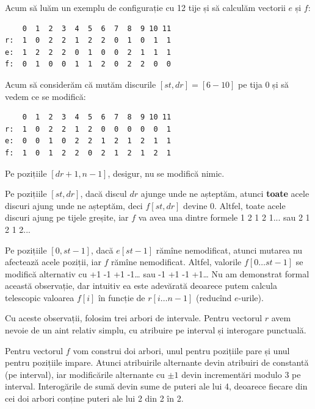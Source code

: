 \documentclass[../main.tex]{subfiles}
\begin{document}
Acum să luăm un exemplu de configurație cu 12 tije și să calculăm vectorii $e$ și $f$:

\begin{verbatim}
    0  1  2  3  4  5  6  7  8  9 10 11
r:  1  0  2  2  1  2  2  0  1  0  1  1
e:  1  2  2  2  0  1  0  0  2  1  1  1
f:  0  1  0  0  1  1  2  0  2  2  0  0
\end{verbatim}

Acum să considerăm că mutăm discurile $[st, dr] = [6-10]$ pe tija 0 și să vedem ce se modifică:

\begin{verbatim}
    0  1  2  3  4  5  6  7  8  9 10 11
r:  1  0  2  2  1  2  0  0  0  0  0  1
e:  0  0  1  0  2  2  1  2  1  2  1  1
f:  1  0  1  2  2  0  2  1  2  1  2  1
\end{verbatim}

Pe pozițiile $[dr+1, n-1]$, desigur, nu se modifică nimic.

Pe pozițiile $[st, dr]$, dacă discul $dr$ ajunge unde ne așteptăm, atunci \textbf{toate} acele discuri ajung unde ne așteptăm, deci $f[st, dr]$ devine 0. Altfel, toate acele discuri ajung pe tijele greșite, iar $f$ va avea una dintre formele 1 2 1 2 1... sau 2 1 2 1 2...

Pe pozițiile $[0,st-1]$, dacă $e[st-1]$ rămîne nemodificat, atunci mutarea nu afectează acele poziții, iar $f$ rămîne nemodificat. Altfel, valorile $f[0 \dots st-1]$ se modifică alternativ cu +1 -1 +1 -1… sau -1 +1 -1 +1… Nu am demonstrat formal această observație, dar intuitiv ea este adevărată deoarece putem calcula telescopic valoarea $f[i]$ în funcție de $r[i \dots n - 1]$ (reducînd $e$-urile).

Cu aceste observații, folosim trei arbori de intervale. Pentru vectorul $r$ avem nevoie de un aint relativ simplu, cu atribuire pe interval și interogare punctuală.

Pentru vectorul $f$ vom construi doi arbori, unul pentru pozițiile pare și unul pentru pozițiile impare. Atunci atribuirile alternante devin atribuiri de constantă (pe interval), iar modificările alternante cu $\pm 1$ devin incrementări modulo 3 pe interval. Interogările de sumă devin sume de puteri ale lui 4, deoarece fiecare din cei doi arbori conține puteri ale lui 2 din 2 în 2.
\end{document}
